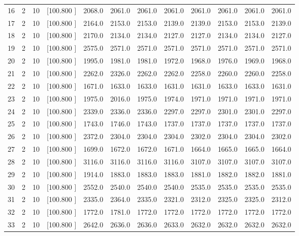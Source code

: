 \documentclass[12pt,a4paper]{article}
\begin{document}
\begin{center}
{\begin{tabular}{r r r r r r r r r r r r}
  16&  2& 10&[100.800   ]&  2068.0&  2061.0&  2061.0&  2061.0&  2061.0&  2061.0&  2061.0&  2061.0\\[-0.02in]
  17&  2& 10&[100.800   ]&  2164.0&  2153.0&  2153.0&  2139.0&  2139.0&  2153.0&  2153.0&  2139.0\\[-0.02in]
  18&  2& 10&[100.800   ]&  2170.0&  2134.0&  2134.0&  2127.0&  2127.0&  2134.0&  2134.0&  2127.0\\[-0.02in]
  19&  2& 10&[100.800   ]&  2575.0&  2571.0&  2571.0&  2571.0&  2571.0&  2571.0&  2571.0&  2571.0\\[-0.02in]
  20&  2& 10&[100.800   ]&  1995.0&  1981.0&  1981.0&  1972.0&  1968.0&  1976.0&  1969.0&  1968.0\\[-0.02in]
  21&  2& 10&[100.800   ]&  2262.0&  2326.0&  2262.0&  2262.0&  2258.0&  2260.0&  2260.0&  2258.0\\[-0.02in]
  22&  2& 10&[100.800   ]&  1671.0&  1633.0&  1633.0&  1631.0&  1631.0&  1633.0&  1633.0&  1631.0\\[-0.02in]
  23&  2& 10&[100.800   ]&  1975.0&  2016.0&  1975.0&  1974.0&  1971.0&  1971.0&  1971.0&  1971.0\\[-0.02in]
  24&  2& 10&[100.800   ]&  2339.0&  2336.0&  2336.0&  2297.0&  2297.0&  2301.0&  2301.0&  2297.0\\[-0.02in]
  25&  2& 10&[100.800   ]&  1743.0&  1746.0&  1743.0&  1737.0&  1737.0&  1737.0&  1737.0&  1737.0\\[-0.02in]
  26&  2& 10&[100.800   ]&  2372.0&  2304.0&  2304.0&  2304.0&  2302.0&  2304.0&  2304.0&  2302.0\\[-0.02in]
  27&  2& 10&[100.800   ]&  1699.0&  1672.0&  1672.0&  1671.0&  1664.0&  1665.0&  1665.0&  1664.0\\[-0.02in]
  28&  2& 10&[100.800   ]&  3116.0&  3116.0&  3116.0&  3116.0&  3107.0&  3107.0&  3107.0&  3107.0\\[-0.02in]
  29&  2& 10&[100.800   ]&  1914.0&  1883.0&  1883.0&  1883.0&  1881.0&  1882.0&  1882.0&  1881.0\\[-0.02in]
  30&  2& 10&[100.800   ]&  2552.0&  2540.0&  2540.0&  2540.0&  2535.0&  2535.0&  2535.0&  2535.0\\[-0.02in]
  31&  2& 10&[100.800   ]&  2335.0&  2364.0&  2335.0&  2321.0&  2312.0&  2325.0&  2325.0&  2312.0\\[-0.02in]
  32&  2& 10&[100.800   ]&  1772.0&  1781.0&  1772.0&  1772.0&  1772.0&  1772.0&  1772.0&  1772.0\\[-0.02in]
  33&  2& 10&[100.800   ]&  2642.0&  2636.0&  2636.0&  2633.0&  2632.0&  2632.0&  2632.0&  2632.0\\[-0.02in]

\end{tabular}}
\end{center}
\end{document}
